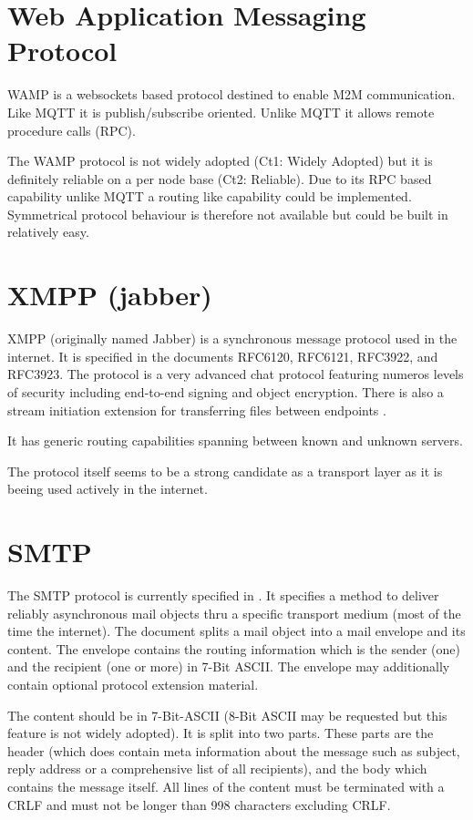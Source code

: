 \section{Web Application Messaging Protocol}
WAMP is a websockets based protocol destined to enable M2M communication. Like MQTT it is publish/subscribe oriented. Unlike MQTT it allows remote procedure calls (RPC).

The WAMP protocol is not widely adopted (Ct1: Widely Adopted) but it is definitely reliable on a per node base (Ct2: Reliable). Due to its RPC based capability unlike MQTT a routing like capability could be implemented. Symmetrical protocol behaviour is therefore not available but could be built in relatively easy.

\section{XMPP (jabber)}
XMPP (originally named Jabber) is a synchronous message protocol used in the internet. It is specified in the documents RFC6120\cite{RFC6120}, RFC6121\cite{RFC6120}, RFC3922\cite{RFC3922}, and RFC3923\cite{RFC3923}. The protocol is a very advanced chat protocol featuring numeros levels of security including end-to-end signing and object encryption\cite{RFC3923}. There is also a stream initiation extension for transferring files between endpoints \cite{xep0096}.

It has generic routing capabilities spanning between known and unknown servers.

The protocol itself seems to be a strong candidate as a transport layer as it is beeing used actively in the internet.


\section{SMTP}
The SMTP protocol is currently specified in \cite{RFC5321}. It specifies a method to deliver reliably asynchronous mail objects thru a specific transport medium (most of the time the internet). The document splits a mail object into a mail envelope and its content. The envelope contains the routing information which is the sender (one) and the recipient (one or more) in 7-Bit ASCII. The envelope may additionally contain optional protocol extension material. \par

The content should be in 7-Bit-ASCII (8-Bit ASCII may be requested but this feature is not widely adopted). It is split into two parts. These parts are the header (which does contain meta information about the message such as subject, reply address or a comprehensive list of all recipients), and the body which contains the message itself. All lines of the content must be terminated with a CRLF and must not be longer than 998 characters excluding CRLF.\par

